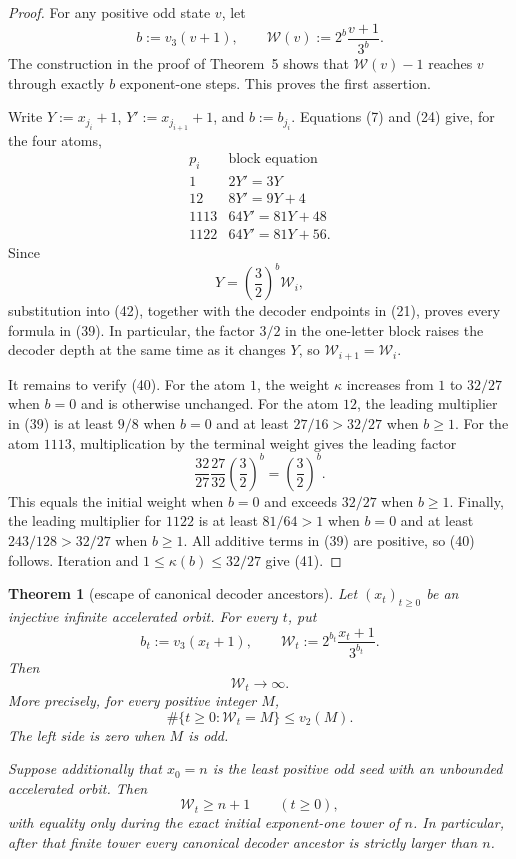 \documentclass[11pt]{article}
\newtheorem{theorem}{Theorem}
\begin{document}
\begin{proof}
For any positive odd state $v$, let
\[
  b:=v_3(v+1),
  \qquad
  \mathcal W(v):=2^b\frac{v+1}{3^b}.
\]
The construction in the proof of Theorem~5 shows that
$\mathcal W(v)-1$ reaches $v$ through exactly $b$ exponent-one steps.
This proves the first assertion.

Write $Y:=x_{j_i}+1$, $Y':=x_{j_{i+1}}+1$, and
$b:=b_{j_i}$.  Equations (7) and (24) give, for the four atoms,
\[
\begin{array}{c|c}
  p_i&\text{block equation}\\ \hline
  1&2Y'=3Y\\
  12&8Y'=9Y+4\\
  1113&64Y'=81Y+48\\
  1122&64Y'=81Y+56.
\end{array}
\tag{42}
\]
Since
\[
  Y=\left(\frac32\right)^b\mathcal W_i,
  \tag{43}
\]
substitution into (42), together with the decoder endpoints in (21),
proves every formula in (39).  In particular, the factor $3/2$ in the
one-letter block raises the decoder depth at the same time as it changes
$Y$, so $\mathcal W_{i+1}=\mathcal W_i$.

It remains to verify (40).  For the atom $1$, the weight $\kappa$ increases
from $1$ to $32/27$ when $b=0$ and is otherwise unchanged.  For the atom
$12$, the leading multiplier in (39) is at least $9/8$ when $b=0$ and at
least $27/16>32/27$ when $b\geq1$.  For the atom $1113$, multiplication
by the terminal weight gives the leading factor
\[
  \frac{32}{27}\frac{27}{32}
  \left(\frac32\right)^b
  =
  \left(\frac32\right)^b.
\]
This equals the initial weight when $b=0$ and exceeds $32/27$ when
$b\geq1$.  Finally, the leading multiplier for $1122$ is at least
$81/64>1$ when $b=0$ and at least
$243/128>32/27$ when $b\geq1$.  All additive terms in (39) are positive,
so (40) follows.  Iteration and
$1\leq\kappa(b)\leq32/27$ give (41).
\end{proof}

\begin{theorem}[escape of canonical decoder ancestors]
Let $(x_t)_{t\geq0}$ be an injective infinite accelerated orbit.  For every
$t$, put
\[
  b_t:=v_3(x_t+1),
  \qquad
  \mathcal W_t:=2^{b_t}\frac{x_t+1}{3^{b_t}}.
  \tag{44}
\]
Then
\[
  \boxed{\mathcal W_t\longrightarrow\infty.}
  \tag{45}
\]
More precisely, for every positive integer $M$,
\[
  \#\{t\geq0:\mathcal W_t=M\}
  \leq v_2(M).
  \tag{46}
\]
The left side is zero when $M$ is odd.

Suppose additionally that $x_0=n$ is the least positive odd seed with an
unbounded accelerated orbit.  Then
\[
  \mathcal W_t\geq n+1
  \qquad(t\geq0),
  \tag{47}
\]
with equality only during the exact initial exponent-one tower of $n$.
In particular, after that finite tower every canonical decoder ancestor is
strictly larger than $n$.
\end{theorem}
\end{document}
